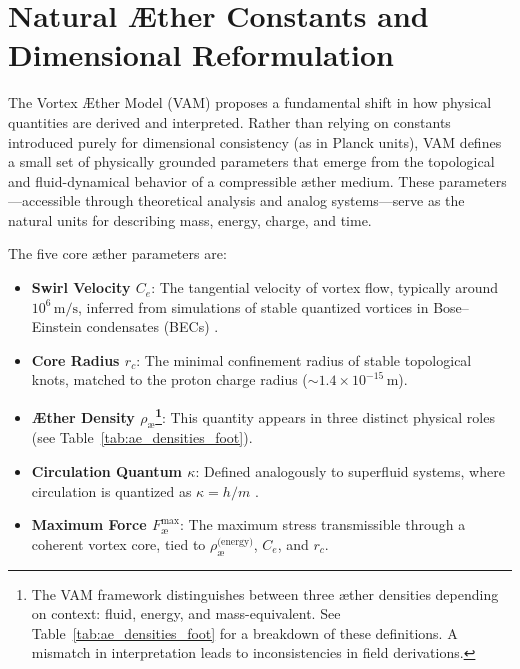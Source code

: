 \section{Natural Æther Constants and Dimensional Reformulation}

The Vortex Æther Model (VAM) proposes a fundamental shift in how physical quantities are derived and interpreted. Rather than relying on constants introduced purely for dimensional consistency (as in Planck units), VAM defines a small set of physically grounded parameters that emerge from the topological and fluid-dynamical behavior of a compressible æther medium. These parameters—accessible through theoretical analysis and analog systems—serve as the natural units for describing mass, energy, charge, and time.

The five core æther parameters are:

\begin{itemize}
    \item \textbf{Swirl Velocity \( C_e \)}: The tangential velocity of vortex flow, typically around \( 10^6 \, \text{m/s} \), inferred from simulations of stable quantized vortices in Bose–Einstein condensates (BECs) \cite{Pethick2008BEC,Kleckner2013KnottedVortices}.
    \item \textbf{Core Radius \( r_c \)}: The minimal confinement radius of stable topological knots, matched to the proton charge radius (\( \sim 1.4 \times 10^{-15} \, \text{m} \)).
    \item \textbf{Æther Density \( \rho_\text{\ae} \)\footnote{The VAM framework distinguishes between three æther densities depending on context: fluid, energy, and mass-equivalent. See Table~\ref{tab:ae_densities_foot} for a breakdown of these definitions. A mismatch in interpretation leads to inconsistencies in field derivations.}}: This quantity appears in three distinct physical roles (see Table~\ref{tab:ae_densities_foot}).
    \item \textbf{Circulation Quantum \( \kappa \)}: Defined analogously to superfluid systems, where circulation is quantized as \( \kappa = h/m \) \cite{Donnelly1991QuantizedVortices}.
    \item \textbf{Maximum Force \( F^{\text{max}}_{\text{\ae}} \)}: The maximum stress transmissible through a coherent vortex core, tied to \( \rho_\text{\ae}^{\text{(energy)}} \), \( C_e \), and \( r_c \).
\end{itemize}

\vspace{0.5em}

